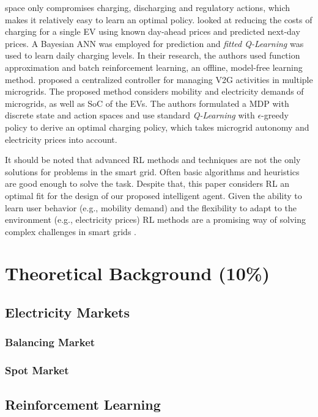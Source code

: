 \documentclass[12pt, article]{article}
\begin{document}
space only compromises charging, discharging and regulatory actions, which makes
it relatively easy to learn an optimal policy.
\textcite{chis16_reinf_learn_based_plug_in} looked at reducing the costs of
charging for a single EV using known day-ahead prices and predicted next-day
prices. A Bayesian ANN was employed for prediction and \emph{fitted Q-Learning} was
used to learn daily charging levels. In their research, the authors used
function approximation and batch reinforcement learning, an offline, model-free
learning method. \textcite{ko18_mobil_aware_vehic_to_grid} proposed a centralized
controller for managing V2G activities in multiple microgrids. The proposed
method considers mobility and electricity demands of microgrids, as well as SoC
of the EVs. The authors formulated a MDP with discrete state and action spaces
and use standard \emph{Q-Learning} with \(\epsilon\)-greedy policy to derive an optimal
charging policy, which takes microgrid autonomy and electricity prices into
account.

It should be noted that advanced RL methods and techniques are not the only
solutions for problems in the smart grid. Often basic algorithms and heuristics
are good enough to solve the task. Despite that, this paper considers RL an
optimal fit for the design of our proposed intelligent agent. Given the ability
to learn user behavior (e.g., mobility demand) and the flexibility to adapt to
the environment (e.g., electricity prices) RL methods are a promising way of
solving complex challenges in smart grids
\parencite{vazquez-canteli19_reinf_learn_deman_respon}.


\section{Theoretical Background (10\%)}
\label{sec:org43fbab4}
\subsection{Electricity Markets}
\label{sec:org15e69bd}
\subsubsection{Balancing Market}
\label{sec:org99a15c6}
\subsubsection{Spot Market}
\label{sec:orgdf761f1}
\subsection{Reinforcement Learning \label{reinforcement-learning}}
\label{sec:org90cdc72}
\end{document}
